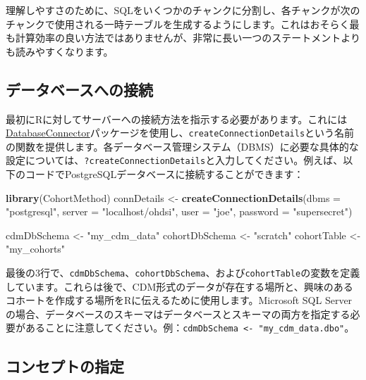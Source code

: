 \documentclass[
  11pt]{book}
\newenvironment{Shaded}{\begin{snugshade}}{\end{snugshade}}
\newcommand{\AttributeTok}[1]{\textcolor[rgb]{0.13,0.29,0.53}{#1}}
\newcommand{\FunctionTok}[1]{\textcolor[rgb]{0.13,0.29,0.53}{\textbf{#1}}}
\newcommand{\NormalTok}[1]{#1}
\newcommand{\OtherTok}[1]{\textcolor[rgb]{0.56,0.35,0.01}{#1}}
\newcommand{\StringTok}[1]{\textcolor[rgb]{0.31,0.60,0.02}{#1}}
\theoremstyle{definition}
\theoremstyle{definition}
\theoremstyle{definition}
\theoremstyle{definition}
\theoremstyle{remark}
\begin{document}
理解しやすさのために、SQLをいくつかのチャンクに分割し、各チャンクが次のチャンクで使用される一時テーブルを生成するようにします。これはおそらく最も計算効率の良い方法ではありませんが、非常に長い一つのステートメントよりも読みやすくなります。

\subsection{データベースへの接続}\label{ux30c7ux30fcux30bfux30d9ux30fcux30b9ux3078ux306eux63a5ux7d9a-1}

最初にRに対してサーバーへの接続方法を指示する必要があります。これには\href{https://ohdsi.github.io/DatabaseConnector/}{DatabaseConnector}パッケージを使用し、\texttt{createConnectionDetails}という名前の関数を提供します。各データベース管理システム（DBMS）に必要な具体的な設定については、\texttt{?createConnectionDetails}と入力してください。例えば、以下のコードでPostgreSQLデータベースに接続することができます：

\begin{Shaded}
\begin{Highlighting}[]
\FunctionTok{library}\NormalTok{(CohortMethod)}
\NormalTok{connDetails }\OtherTok{\textless{}{-}} \FunctionTok{createConnectionDetails}\NormalTok{(}\AttributeTok{dbms =} \StringTok{"postgresql"}\NormalTok{,}
                                       \AttributeTok{server =} \StringTok{"localhost/ohdsi"}\NormalTok{,}
                                       \AttributeTok{user =} \StringTok{"joe"}\NormalTok{,}
                                       \AttributeTok{password =} \StringTok{"supersecret"}\NormalTok{)}

\NormalTok{cdmDbSchema }\OtherTok{\textless{}{-}} \StringTok{"my\_cdm\_data"}
\NormalTok{cohortDbSchema }\OtherTok{\textless{}{-}} \StringTok{"scratch"}
\NormalTok{cohortTable }\OtherTok{\textless{}{-}} \StringTok{"my\_cohorts"}
\end{Highlighting}
\end{Shaded}

最後の3行で、\texttt{cdmDbSchema}、\texttt{cohortDbSchema}、および\texttt{cohortTable}の変数を定義しています。これらは後で、CDM形式のデータが存在する場所と、興味のあるコホートを作成する場所をRに伝えるために使用します。Microsoft SQL Serverの場合、データベースのスキーマはデータベースとスキーマの両方を指定する必要があることに注意してください。例：\texttt{cdmDbSchema\ \textless{}-\ "my\_cdm\_data.dbo"}。

\subsection{コンセプトの指定}\label{ux30b3ux30f3ux30bbux30d7ux30c8ux306eux6307ux5b9a}
\end{document}
